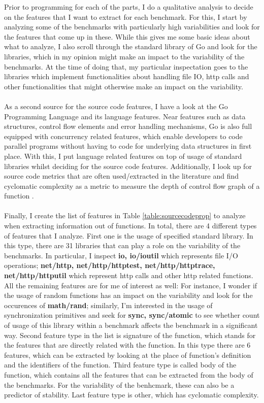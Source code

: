 \documentclass{seal_thesis}
\begin{document}
Prior to programming for each of the parts, I do a qualitative analysis to decide on the features that I want to extract for each benchmark. For this, I start by analyzing some of the benchmarks with particularly high variabilities and look for the features that come up in these. While this gives me some basic ideas about what to analyze, I also scroll through the standard library of Go \cite{gopackages} and look for the libraries, which in my opinion might make an impact to the variability of the benchmarks. At the time of doing that, my particular inspectation goes to the libraries which implement functionalities about handling file IO, http calls and other functionalities that might otherwise make an impact on the variability.\\
\\
As a second source for the source code features, I have a look at the Go Programming Language \cite{go} and its language features. Near features such as data structures, control flow elements and error handling mechanisms, Go is also full equipped with concurrency related features, which enable developers to code parallel programs without having to code for underlying data structures in first place. With this, I put language related features on top of usage of standard libraries whilst deciding for the source code features. Additionally, I look up for source code metrics that are often used/extracted in the literature and find cyclomatic complexity as a metric to measure the depth of control flow graph of a function \cite{shepperd1988critique}.\\
\\
Finally, I create the list of features in Table \ref{table:sourcecodeprop} to analyze when extracting information out of functions. In total, there are 4 different types of features that I analyze. First one is the usage of specified standard library. In this type, there are 31 libraries that can play a role on the variability of the benchmarks. In particular, I inspect \textbf{io, io/ioutil} which represents file I/O operations; \textbf{net/http, net/http/httptest, net/http/httptrace, net/http/httputil} which represent http calls and other http related functions. All the remaining features are for me of interest as well: For instance, I wonder if the usage of random functions has an impact on the variability and look for the occurences of \textbf{math/rand}; similarly, I'm interested in the usage of synchronization primitives and seek for \textbf{sync, sync/atomic} to see whether count of usage of this library within a benchmark affects the benchmark in a significant way. Second feature type in the list is signature of the function, which stands for the features that are directly related with the function. In this type there are 6 features, which can be extracted by looking at the place of function's definition and the identifiers of the function. Third feature type is called body of the function, which contains all the features that can be extracted from the body of the benchmarks. For the variability of the benhcmark, these can also be a predictor of stability. Last feature type is other, which has cyclomatic complexity.\\
\end{document}
